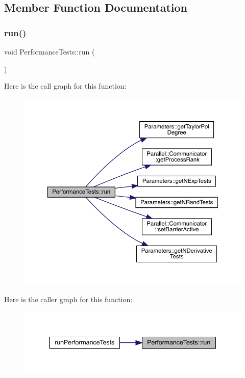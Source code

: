 \subsection{Member Function Documentation}
\mbox{\label{class_performance_tests_aa55ebdbc84db93cc45adfdf7163f90b4}} 
\subsubsection{\texorpdfstring{run()}{run()}}
{\footnotesize\ttfamily void Performance\+Tests\+::run (\begin{DoxyParamCaption}{ }\end{DoxyParamCaption})}

Here is the call graph for this function\+:\nopagebreak
\begin{figure}[H]
\begin{center}
\leavevmode
\includegraphics[width=350pt]{class_performance_tests_aa55ebdbc84db93cc45adfdf7163f90b4_cgraph}
\end{center}
\end{figure}
Here is the caller graph for this function\+:\nopagebreak
\begin{figure}[H]
\begin{center}
\leavevmode
\includegraphics[width=344pt]{class_performance_tests_aa55ebdbc84db93cc45adfdf7163f90b4_icgraph}
\end{center}
\end{figure}


